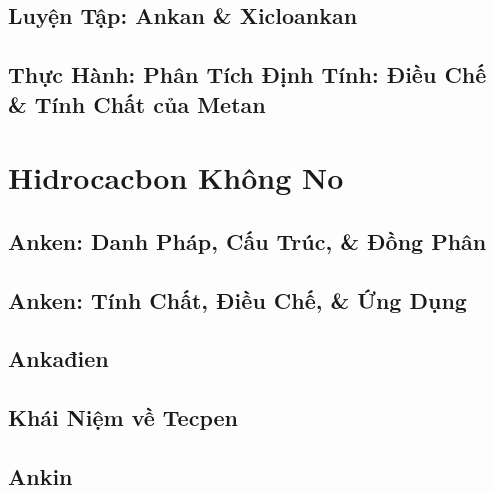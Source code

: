 \documentclass[oneside]{book}
\numberwithin{equation}{section}
\begin{document}

\section{Luyện Tập: Ankan \& Xicloankan}


\section{Thực Hành: Phân Tích Định Tính: Điều Chế \& Tính Chất của Metan}


\chapter{Hidrocacbon Không No}

\section{Anken: Danh Pháp, Cấu Trúc, \& Đồng Phân}


\section{Anken: Tính Chất, Điều Chế, \& Ứng Dụng}


\section{Ankađien}


\section{Khái Niệm về Tecpen}


\section{Ankin}
\end{document}
